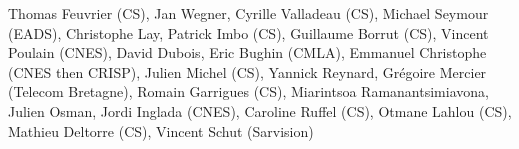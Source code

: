 Thomas Feuvrier (CS), Jan Wegner, Cyrille Valladeau (CS), Michael Seymour (EADS), Christophe Lay, Patrick Imbo (CS), Guillaume Borrut (CS), Vincent Poulain (CNES), David Dubois, Eric Bughin (CMLA), Emmanuel Christophe (CNES then CRISP), Julien Michel (CS), Yannick Reynard, Gr\'egoire Mercier (Telecom Bretagne), Romain Garrigues (CS), Miarintsoa Ramanantsimiavona, Julien Osman, Jordi Inglada (CNES), Caroline Ruffel (CS), Otmane Lahlou (CS), Mathieu Deltorre (CS), Vincent Schut (Sarvision)